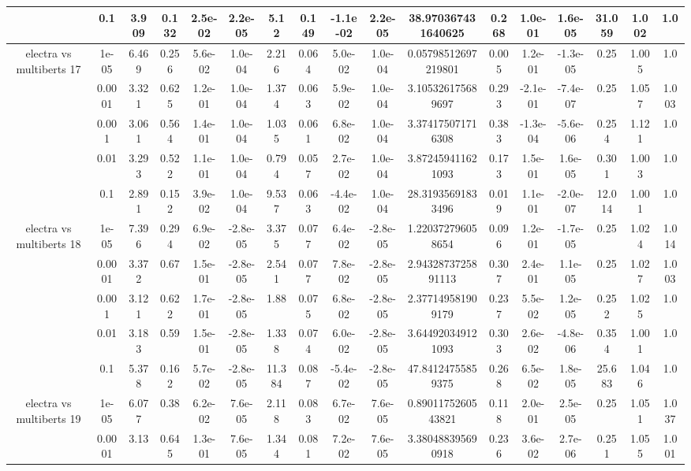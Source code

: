 \begin{tabular}{|c|c|c|c|c|c|c|c|c|c|c|c|c|c|c|c|c|}
 & 0.1 & 3.909 & 0.132 & 2.5e-02 & 2.2e-05 & 5.12 & 0.149 & -1.1e-02 & 2.2e-05 & 38.970367431640625 & 0.268 & 1.0e-01 & 1.6e-05 & 31.059 & 1.002 & 1.0 \\
\hline
\multirow{5}{*}{electra  vs multiberts 17} & 1e-05 & 6.469 & 0.256 & 5.6e-02 & 1.0e-04 & 2.216 & 0.064 & 5.0e-02 & 1.0e-04 & 0.05798512697219801 & 0.005 & 1.2e-01 & -1.3e-05 & 0.25 & 1.005 & 1.0 \\
 & 0.0001 & 3.321 & 0.625 & 1.2e-01 & 1.0e-04 & 1.374 & 0.063 & 5.9e-02 & 1.0e-04 & 3.105326175689697 & 0.293 & -2.1e-01 & -7.4e-07 & 0.25 & 1.057 & 1.003 \\
 & 0.001 & 3.061 & 0.564 & 1.4e-01 & 1.0e-04 & 1.035 & 0.061 & 6.8e-02 & 1.0e-04 & 3.374175071716308 & 0.383 & -1.3e-04 & -5.6e-06 & 0.254 & 1.121 & 1.0 \\
 & 0.01 & 3.293 & 0.522 & 1.1e-01 & 1.0e-04 & 0.794 & 0.057 & 2.7e-02 & 1.0e-04 & 3.872459411621093 & 0.173 & 1.5e-01 & 1.6e-05 & 0.301 & 1.003 & 1.0 \\
 & 0.1 & 2.891 & 0.152 & 3.9e-02 & 1.0e-04 & 9.537 & 0.063 & -4.4e-02 & 1.0e-04 & 28.31935691833496 & 0.019 & 1.1e-01 & -2.0e-07 & 12.014 & 1.001 & 1.0 \\
\hline
\multirow{5}{*}{electra  vs multiberts 18} & 1e-05 & 7.396 & 0.294 & 6.9e-02 & -2.8e-05 & 3.375 & 0.077 & 6.4e-02 & -2.8e-05 & 1.220372796058654 & 0.096 & 1.2e-01 & -1.7e-05 & 0.25 & 1.024 & 1.014 \\
 & 0.0001 & 3.372 & 0.67 & 1.5e-01 & -2.8e-05 & 2.541 & 0.077 & 7.8e-02 & -2.8e-05 & 2.9432873725891113 & 0.307 & 2.4e-01 & 1.1e-05 & 0.25 & 1.027 & 1.003 \\
 & 0.001 & 3.121 & 0.622 & 1.7e-01 & -2.8e-05 & 1.88 & 0.075 & 6.8e-02 & -2.8e-05 & 2.377149581909179 & 0.237 & 5.5e-02 & 1.2e-05 & 0.252 & 1.025 & 1.0 \\
 & 0.01 & 3.183 & 0.59 & 1.5e-01 & -2.8e-05 & 1.338 & 0.074 & 6.0e-02 & -2.8e-05 & 3.644920349121093 & 0.303 & 2.6e-02 & -4.8e-06 & 0.354 & 1.001 & 1.0 \\
 & 0.1 & 5.378 & 0.162 & 5.7e-02 & -2.8e-05 & 11.384 & 0.087 & -5.4e-02 & -2.8e-05 & 47.84124755859375 & 0.268 & 6.5e-02 & 1.8e-05 & 25.683 & 1.046 & 1.0 \\
\hline
\multirow{5}{*}{electra  vs multiberts 19} & 1e-05 & 6.077 & 0.38 & 6.2e-02 & 7.6e-05 & 2.118 & 0.083 & 6.7e-02 & 7.6e-05 & 0.8901175260543821 & 0.118 & 2.0e-01 & 2.5e-05 & 0.25 & 1.051 & 1.037 \\
 & 0.0001 & 3.13 & 0.645 & 1.3e-01 & 7.6e-05 & 1.344 & 0.081 & 7.2e-02 & 7.6e-05 & 3.380488395690918 & 0.236 & 3.6e-02 & 2.7e-06 & 0.251 & 1.055 & 1.001 \\

\end{tabular}
